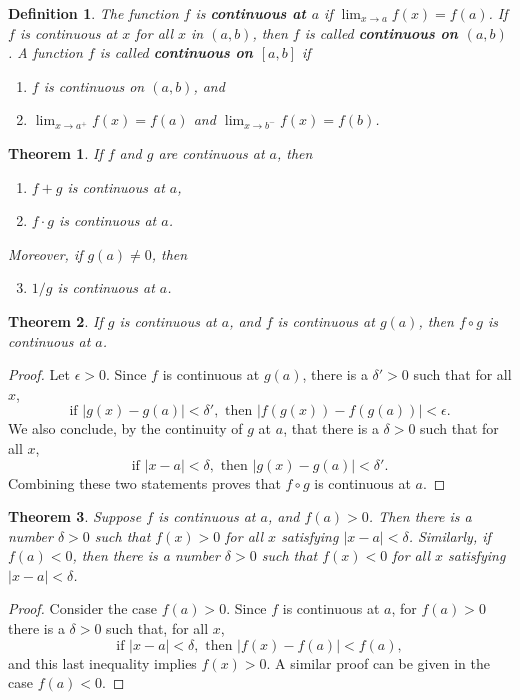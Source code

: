 \documentclass{article}
\numberwithin{corollary}{subsection}
\numberwithin{definition}{subsection}
\newtheorem*{definition*}{Definition}
\numberwithin{lemma}{subsection}
\newtheorem{theorem}{Theorem}
\numberwithin{theorem}{subsection}
\begin{document}
\begin{definition*}
  The function $f$ is \textbf{continuous at $a$} if $\lim_{x \to a} f(x) =
  f(a)$. If $f$ is continuous at $x$ for all $x$ in $(a, b)$, then $f$ is
  called \textbf{continuous on $(a, b)$}. A function $f$ is called
  \textbf{continuous on $[a, b]$} if
  \begin{enumerate}
    \item $f$ is continuous on $(a, b)$, and
    \item $\lim_{x \to a^+} f(x) = f(a)$ and $\lim_{x \to b^-} f(x) = f(b)$.
  \end{enumerate}
\end{definition*}

\begin{theorem}
  If $f$ and $g$ are continuous at $a$, then
  \begin{enumerate}
    \item $f + g$ is continuous at $a$,
    \item $f \cdot g$ is continuous at $a$.
  \end{enumerate}
  Moreover, if $g(a) \neq 0$, then
  \begin{enumerate}
    \setcounter{enumi}{2}
    \item $1/g$ is continuous at $a$.
  \end{enumerate}
\end{theorem}

\begin{theorem}
  If $g$ is continuous at $a$, and $f$ is continuous at $g(a)$, then $f \circ
  g$ is continuous at $a$.
\end{theorem}
\begin{proof}
  Let $\epsilon > 0$. Since $f$ is continuous at $g(a)$, there is a $\delta' >
  0$ such that for all $x$, \[
    \text{if } |g(x) - g(a)| < \delta', \text{ then } |f(g(x)) - f(g(a))| <
      \epsilon.
  \] We also conclude, by the continuity of $g$ at $a$, that there is a $\delta
  > 0$ such that for all $x$, \[
    \text{if } |x - a| < \delta, \text{ then } |g(x) - g(a)| < \delta'.
  \] Combining these two statements proves that $f \circ g$ is continuous at
  $a$.
\end{proof}

\begin{theorem}
  Suppose $f$ is continuous at $a$, and $f(a) > 0$. Then there is a number
  $\delta > 0$ such that $f(x) > 0$ for all $x$ satisfying $|x - a| < \delta$.
  Similarly, if $f(a) < 0$, then there is a number $\delta > 0$ such that $f(x)
  < 0$ for all $x$ satisfying $|x - a| < \delta$.
\end{theorem}
\begin{proof}
  Consider the case $f(a) > 0$. Since $f$ is continuous at $a$, for $f(a) > 0$
  there is a $\delta > 0$ such that, for all $x$, \[
    \text{if } |x - a| < \delta, \text{ then } |f(x) - f(a)| < f(a),
  \] and this last inequality implies $f(x) > 0$. A similar proof can be given
  in the case $f(a) < 0$.
\end{proof}
\end{document}
